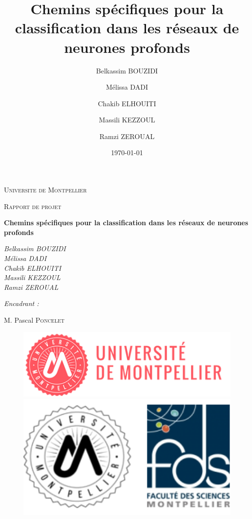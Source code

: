 \documentclass[oneside,13pt,a4paper]{report}
\title{Chemins spécifiques pour la classification dans les réseaux de neurones profonds
}
\author{
    Belkassim BOUZIDI \and
    Mélissa DADI  \and
    Chakib ELHOUITI \and
    Massili KEZZOUL \and
    Ramzi ZEROUAL
}
\date{\today}
\begin{document}
\begin{titlepage}
	\centering
	{\scshape\LARGE Universite de Montpellier\par}
	{\scshape\Large Rapport de projet\par}
	\vspace{1.5cm}
	{\huge\bfseries Chemins spécifiques pour la classification dans les réseaux de neurones profonds\par}
	\vspace{2cm}
	{\Large\itshape
		Belkassim BOUZIDI \\
    	Mélissa DADI \\
		Chakib ELHOUITI \\
		Massili KEZZOUL \\
		Ramzi ZEROUAL \\
		\par}

	\vspace{1.5cm}

	{\Large\itshape
		Encadrant :\par
		M. Pascal \textsc{Poncelet}
		\par}

	\vspace{2cm}

	\begin{figure}[h]
		\begin{minipage}[c]{.46\linewidth}
			\centering
			\includegraphics[width=1\textwidth]{img/univ-montpellier.png}
		\end{minipage}
		\hfill%
		\begin{minipage}[c]{.46\linewidth}
			\centering
			\includegraphics[width=1\textwidth]{img/fds.png}
		\end{minipage}
	\end{figure}


\end{titlepage}
\end{document}
